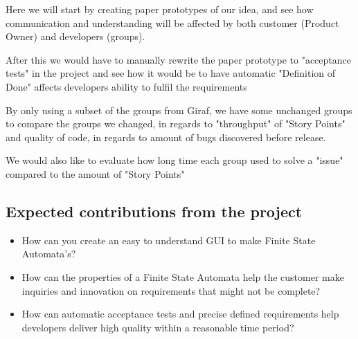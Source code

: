 Here we will start by creating paper prototypes of our idea, and see how communication and understanding will be affected by both customer (Product Owner) and developers (groups).

After this we would have to manually rewrite the paper prototype to "acceptance tests" in the project and see how it would be to have automatic "Definition of Done" affects developers ability to fulfil the requirements

By only using a subset of the groups from Giraf, we have some unchanged groups to compare the groups we changed, in regards to "throughput" of "Story Points" and quality of code, in regards to amount of bugs discovered before release.

We would also like to evaluate how long time each group used to solve a "issue" compared to the amount of "Story Points" 


\subsection{Expected contributions from the project}
\begin{itemize}
    \item How can you create an easy to understand GUI to make Finite State Automata's?
    \item How can the properties of a Finite State Automata help the customer make inquiries and innovation on requirements that might not be complete?
    \item How can automatic acceptance tests and precise defined requirements help developers deliver high quality within a reasonable time period?
\end{itemize}